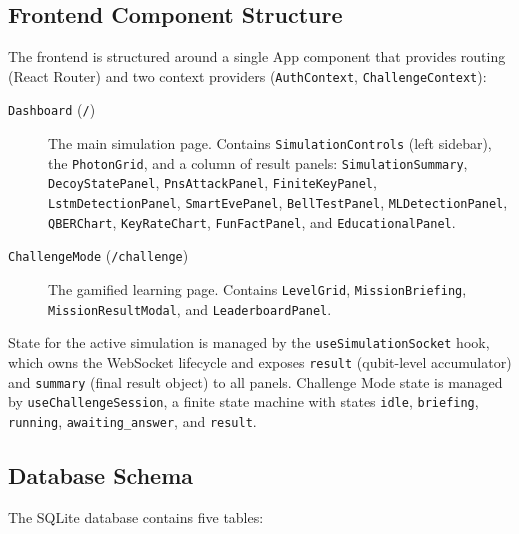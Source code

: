 \documentclass[12pt, a4paper]{article}
\begin{document}
\subsection{Frontend Component Structure}
\label{sec:frontend-structure}

The frontend is structured around a single App component that provides
routing (React Router) and two context providers (\texttt{AuthContext},
\texttt{ChallengeContext}):

\begin{description}
  \item[\texttt{Dashboard} (\texttt{/})] The main simulation page.
        Contains \texttt{SimulationControls} (left sidebar), the
        \texttt{PhotonGrid}, and a column of result panels:
        \texttt{SimulationSummary}, \texttt{DecoyStatePanel},
        \texttt{PnsAttackPanel}, \texttt{FiniteKeyPanel},
        \texttt{LstmDetectionPanel}, \texttt{SmartEvePanel},
        \texttt{BellTestPanel}, \texttt{MLDetectionPanel},
        \texttt{QBERChart}, \texttt{KeyRateChart},
        \texttt{FunFactPanel}, and \texttt{EducationalPanel}.
  \item[\texttt{ChallengeMode} (\texttt{/challenge})] The gamified
        learning page. Contains \texttt{LevelGrid},
        \texttt{MissionBriefing}, \texttt{MissionResultModal}, and
        \texttt{LeaderboardPanel}.
\end{description}

State for the active simulation is managed by the
\texttt{useSimulationSocket} hook, which owns the WebSocket lifecycle and
exposes \texttt{result} (qubit-level accumulator) and \texttt{summary}
(final result object) to all panels. Challenge Mode state is managed by
\texttt{useChallengeSession}, a finite state machine with states
\texttt{idle}, \texttt{briefing}, \texttt{running},
\texttt{awaiting\_answer}, and \texttt{result}.

\subsection{Database Schema}
\label{sec:db-schema}

The SQLite database contains five tables:
\end{document}
